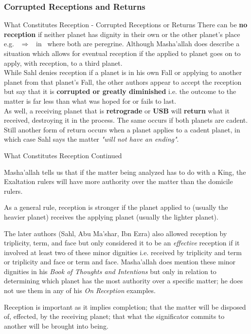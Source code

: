 \subsubsection{Corrupted Receptions and Returns}
\begin{frame}[t]{What Constitutes Reception - Corrupted Receptions or Returns}
There can be \textbf{no reception} if neither planet has dignity in their own or the other planet's place e.g. \Mercury\ $\Rightarrow$ \Jupiter\ in \Taurus\ where both are peregrine. Although Masha'allah does describe a situation which allows for eventual reception if the applied to planet goes on to apply, with reception, to a third planet.\\
\vspace{0.25cm}
While Sahl denies reception if a planet is in his own Fall or applying to another planet from that planet's Fall, the other authors appear to accept the reception but say that it is \textbf{corrupted or greatly diminished} i.e. the outcome to the matter is far less than what was hoped for or fails to last.\\
\vspace{0.25cm}
As well, a receiving planet that is \textbf{retrograde} or \textbf{USB} will \textbf{return} what it received, destroying it in the process. The same occurs if both planets are cadent.\footnotemark[1] \\
\vspace{0.25cm}
Still another form of return occurs when a planet applies to a cadent planet, in which case Sahl says the matter \textsl{"will not have an ending"}.

\end{frame}
\begin{frame}[t]{What Constitutes Reception Continued}

Masha'allah tells us that if the matter being analyzed has to do with a King, the Exaltation rulers will have more authority over the matter than the domicile rulers.

As a general rule, reception is stronger if the planet applied to (usually the heavier planet) receives the applying planet (usually the lighter planet).

The later authors (Sahl, Abu Ma'shar, Ibn Ezra) also allowed reception by triplicity, term, and face but only considered it to be an \textsl{effective} reception if it involved at least two of these minor dignities i.e. received by triplicity and term or triplicity and face or term and face. Masha'allah does mention these minor dignities in his \textsl{Book of Thoughts and Intentions} but only in relation to determining which planet has the most authority over a specific matter; he does not use them in any of his \textsl{On Reception} examples.\footnotemark[1]
\begin{block}{}
Reception is important as it implies completion; that the matter will be disposed of, effected, by the receiving planet; that what the significator commits to another will be brought into being. 
\end{block}
\end{frame}